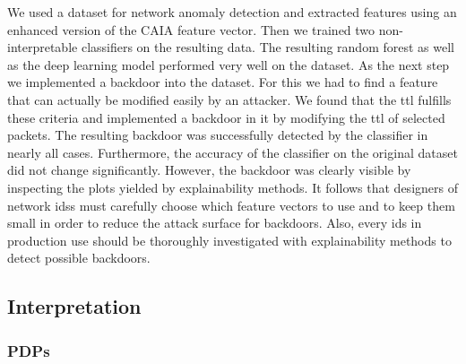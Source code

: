 \documentclass[10pt,sigconf,letterpaper,dvipsnames]{acmart}
\begin{document}
We used a dataset for network anomaly detection and extracted features using an enhanced version of the CAIA feature vector. Then we trained two non-interpretable classifiers on the resulting data. The resulting random forest as well as the deep learning model performed very well on the dataset. As the next step we implemented a backdoor into the dataset. For this we had to find a feature that can actually be modified easily by an attacker. We found that the \gls{ttl} fulfills these criteria and implemented a backdoor in it by modifying the  \gls{ttl} of selected packets. The resulting backdoor was successfully detected by the classifier in nearly all cases. Furthermore, the accuracy of the classifier on the original dataset did not change significantly. However, the backdoor was clearly visible by inspecting the plots yielded by explainability methods. It follows that designers of network \glspl{ids} must carefully choose which feature vectors to use and to keep them small in order to reduce the attack surface for backdoors. Also, every \gls{ids} in production use should be thoroughly investigated with explainability methods to detect possible backdoors.




\subsection{Interpretation}
\subsubsection{PDPs}
\end{document}
